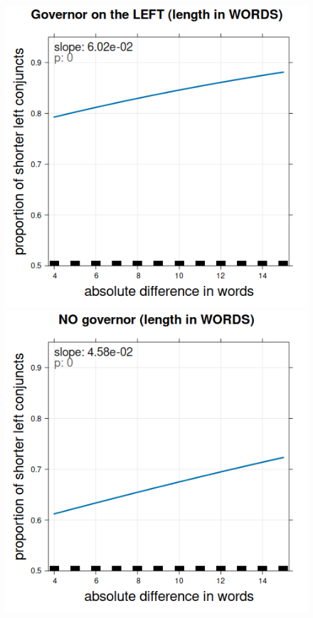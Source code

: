 \begin{figure}[H]
    \centering
    \includegraphics[scale=0.27]{inputs/coca-L.png}
    \includegraphics[scale=0.27]{inputs/coca-0.png}

\end{figure}
